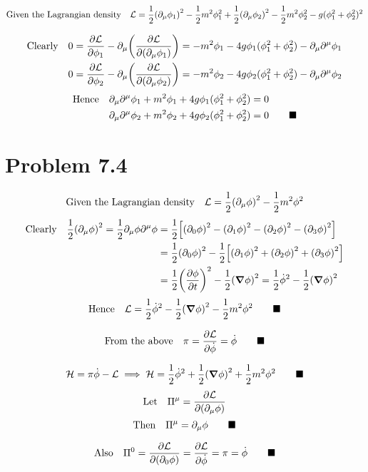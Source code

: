 \documentclass{article}
\begin{document}
\[ \qq*{Given the Lagrangian density} \mathcal{L}=\frac{1}{2}\qty(\partial_{\mu}\phi_1)^2-\frac{1}{2}m^2\phi_1^2+\frac{1}{2}\qty(\partial_{\mu}\phi_2)^2-\frac{1}{2}m^2\phi_2^2-g(\phi_1^2+\phi_2^2)^2\]


\begin{align*}
\qq*{Clearly}0=\pdv{\mathcal{L}}{\phi_1}-\partial_{\mu} \qty(\pdv{\mathcal{L}}{\qty(\partial_{\mu}\phi_1)})&=-m^2 \phi_1-4g\phi_1 (\phi_1^2+\phi_2^2)-\partial_{\mu}\partial^{\mu}\phi_1\\
0=\pdv{\mathcal{L}}{\phi_2}-\partial_{\mu} \qty(\pdv{\mathcal{L}}{\qty(\partial_{\mu}\phi_2)})&=-m^2 \phi_2-4g\phi_2 (\phi_1^2+\phi_2^2)-\partial_{\mu}\partial^{\mu}\phi_2
\end{align*}
\begin{align*}
\qq*{Hence}\partial_{\mu}\partial^{\mu}\phi_1+m^2 \phi_1+4g\phi_1 (\phi_1^2+\phi_2^2)&=0\\
\partial_{\mu}\partial^{\mu}\phi_2+m^2 \phi_2+4g\phi_2 (\phi_1^2+\phi_2^2)&=0\qquad\blacksquare
\end{align*}


\section*{Problem 7.4}



\[ \qq*{Given the Lagrangian density} \mathcal{L}=\frac{1}{2}\qty(\partial_{\mu}\phi)^2-\frac{1}{2}m^2\phi^2\]
\begin{align*}
\qq*{Clearly}\frac{1}{2}\qty(\partial_{\mu}\phi)^2=\frac{1}{2}\partial_{\mu}\phi\partial^{\mu}\phi&=\frac{1}{2}\qty[\qty(\partial_{0}\phi)^2-\qty(\partial_{1}\phi)^2-\qty(\partial_{2}\phi)^2-\qty(\partial_{3}\phi)^2]\\
&=\frac{1}{2}\qty(\partial_{0}\phi)^2-\frac{1}{2}\qty[\qty(\partial_{1}\phi)^2+\qty(\partial_{2}\phi)^2+\qty(\partial_{3}\phi)^2]\\
&=\frac{1}{2}\qty(\pdv{\phi}{t})^2-\frac{1}{2}\qty(\grad \phi)^2=\frac{1}{2}\dot{\phi}^2-\frac{1}{2}\qty(\grad \phi)^2
\end{align*}
\[ \qq*{Hence} \mathcal{L}=\frac{1}{2}\dot{\phi}^2-\frac{1}{2}\qty(\grad \phi)^2-\frac{1}{2}m^2\phi^2\qquad\blacksquare\]

\[\qq*{From the above}\pi=\pdv{\mathcal{L}}{\dot{\phi}}=\dot{\phi}\qquad\blacksquare\]

\[\mathcal{H}=\pi \dot{\phi}-\mathcal{L}\implies \mathcal{H}=\frac{1}{2}\dot{\phi}^2+\frac{1}{2}\qty(\grad \phi)^2+\frac{1}{2}m^2 \phi^2 \qquad\blacksquare\]
\[\qq*{Let}\Pi^{\mu}=\pdv{\mathcal{L}}{(\partial_{\mu}\phi)}
\]
\[\qq*{Then}\Pi^{\mu}=\partial_{\mu}\phi \qquad\blacksquare\]

\[\qq*{Also}\Pi^{0}=\pdv{\mathcal{L}}{(\partial_{0}\phi)}=\pdv{\mathcal{L}}{\dot{\phi}}=\pi=\dot{\phi}
\qquad\blacksquare\]
\end{document}
